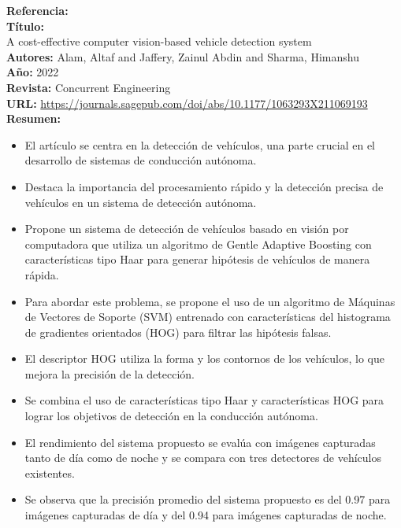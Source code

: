 \documentclass[10pt,letterpaper,final]{article}
\begin{document}
\begin{longtable}
        \hline
        \noindent \textbf{Referencia:}~\cite{alam2022cost} \\
        \textbf{Título:} \\
        A cost-effective computer vision-based vehicle detection system \\
        \textbf{Autores:}
        Alam, Altaf and Jaffery, Zainul Abdin and Sharma, Himanshu \\
        \textbf{Año:}
        2022 \\
        \textbf{Revista:}
        Concurrent Engineering \\
        \textbf{URL:}
        \url{https://journals.sagepub.com/doi/abs/10.1177/1063293X211069193} \\
        \textbf{Resumen:} \\
        \begin{itemize}
            \item El artículo se centra en la detección de vehículos, una parte crucial en el desarrollo de sistemas de conducción autónoma.
            \item Destaca la importancia del procesamiento rápido y la detección precisa de vehículos en un sistema de detección autónoma.
            \item Propone un sistema de detección de vehículos basado en visión por computadora que utiliza un algoritmo
            de Gentle Adaptive Boosting con características tipo Haar para generar hipótesis de vehículos de manera rápida.
            \item Para abordar este problema, se propone el uso de un algoritmo de Máquinas de Vectores de Soporte (SVM) entrenado con
             características del histograma de gradientes orientados (HOG) para filtrar las hipótesis falsas.
            \item El descriptor HOG utiliza la forma y los contornos de los vehículos, lo que mejora la precisión de la detección.
            \item Se combina el uso de características tipo Haar y características HOG para lograr los objetivos de detección en la conducción autónoma.
            \item El rendimiento del sistema propuesto se evalúa con imágenes capturadas tanto de día como de noche y se compara
            con tres detectores de vehículos existentes.
            \item Se observa que la precisión promedio del sistema propuesto es del 0.97 para imágenes capturadas de día
            y del 0.94 para imágenes capturadas de noche.

\end{itemize}
\end{longtable}
\end{document}
